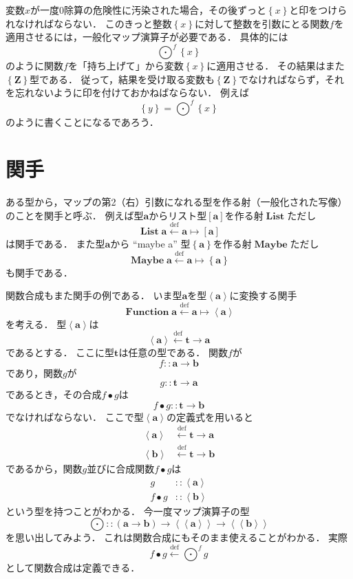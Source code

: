 \documentclass[twocolumn]{jsbook}
\newcommand{\comp}{\bullet} %
\newcommand{\defeq}{\xleftarrow{\text{def}}}
\newcommand{\mapfunc}{\bigodot} %
\newcommand{\typename}[1]{\bm{#1}}
\newcommand{\integertype}{\typename{Z}}
\newcommand{\function}[1]{\left\langle#1\right\rangle}
\newcommand{\generalcontainer}[1]{\left\langle\!\left\langle#1\right\rangle\!\right\rangle}
\newcommand{\listtype}[1]{\left[#1\right]}
\newcommand{\maybe}[1]{\left\{#1\right\}}
\newcommand{\functor}[1]{\mathop{\textbf{#1}}}
\newcommand{\functionfunctor}{\mathop{\functor{Function}}}
\newcommand{\listfunctor}{\mathop{\functor{List}}}
\newcommand{\maybefunctor}{\mathop{\functor{Maybe}}}
\begin{document}
変数$x$が一度$0$除算の危険性に汚染された場合，その後ずっと$\maybe{x}$と印をつけられなければならない．
このきっと整数$\maybe{x}$に対して整数を引数にとる関数$f$を適用させるには，一般化マップ演算子が必要である．
具体的には$$\mapfunc^f\maybe{x}$$のように関数$f$を「持ち上げて」から変数$\maybe{x}$に適用させる．
その結果はまた$\maybe{\integertype}$型である．
従って，結果を受け取る変数も$\maybe{\integertype}$でなければならず，それを忘れないように印を付けておかねばならない．
例えば$$\maybe{y}=\mapfunc^f\maybe{x}$$のように書くことになるであろう．

\section{関手}

ある型から，マップの第2（右）引数になれる型を作る射（一般化された写像）のことを関手と呼ぶ．
例えば型$\typename{a}$からリスト型$[\typename{a}]$を作る射$\listfunctor$ただし$$\listfunctor\typename{a}\defeq\typename{a}\mapsto\listtype{\typename{a}}$$は関手である．
また型$\typename{a}$から ``maybe a'' 型$\maybe{\typename{a}}$を作る射$\maybefunctor$ただし$$\maybefunctor\typename{a}\defeq\typename{a}\mapsto\maybe{\typename{a}}$$も関手である．

関数合成もまた関手の例である．
いま型$\typename{a}$を型$\function{\typename{a}}$に変換する関手$$\functionfunctor\typename{a}\defeq\typename{a}\mapsto\function{\typename{a}}$$を考える．
型$\function{\typename{a}}$は$$\function{\typename{a}}\defeq\typename{t}\rightarrow\typename{a}$$であるとする．
ここに型$\typename{t}$は任意の型である．
関数$f$が$$f::\typename{a}\rightarrow\typename{b}$$であり，関数$g$が$$g::\typename{t}\rightarrow\typename{a}$$であるとき，その合成$f\comp g$は$$f\comp g::\typename{t}\rightarrow\typename{b}$$でなければならない．
ここで型$\function{\typename{a}}$の定義式を用いると
\begin{align*}
\function{\typename{a}}&\defeq\typename{t}\rightarrow\typename{a}\\
\function{\typename{b}}&\defeq\typename{t}\rightarrow\typename{b}
\end{align*}
であるから，関数$g$並びに合成関数$f\comp g$は
\begin{align*}
g&::\function{\typename{a}}\\
f\comp g&::\function{\typename{b}}
\end{align*}
という型を持つことがわかる．
今一度マップ演算子の型$$\mapfunc::(\typename{a}\rightarrow\typename{b})\rightarrow\generalcontainer{\typename{a}}\rightarrow\generalcontainer{\typename{b}}$$を思い出してみよう．
これは関数合成にもそのまま使えることがわかる．
実際$$f\comp g\defeq\mapfunc^fg$$として関数合成は定義できる．
\end{document}
